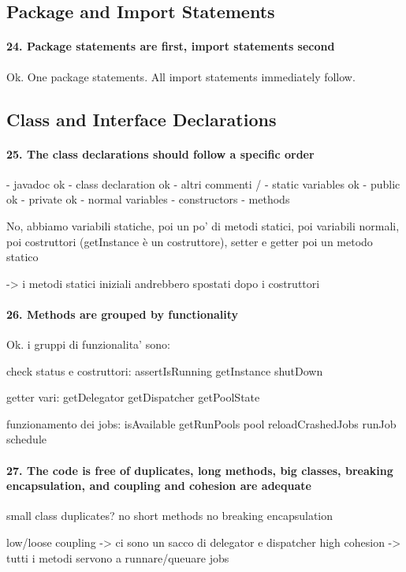 \documentclass[english]{article}
\begin{document}
\subsection{Package and Import Statements}
\paragraph{24. Package statements are first, import statements second}
Ok.
One package statements.
All import statements immediately follow.

\subsection{Class and Interface Declarations}
\paragraph{25. The class declarations should follow a specific order}
- javadoc ok
- class declaration ok
- altri commenti /
- static variables ok
 - public ok
 - private ok
- normal variables 
- constructors
- methods

No, abbiamo variabili statiche, poi un po' di metodi statici, poi variabili normali, poi costruttori (getInstance è un costruttore), setter e getter poi un metodo statico

-> i metodi statici iniziali andrebbero spostati dopo i costruttori


\paragraph{26. Methods are grouped by functionality}
Ok.
i gruppi di funzionalita' sono:

check status e costruttori:
assertIsRunning
getInstance
shutDown

getter vari:
getDelegator
getDispatcher
getPoolState

funzionamento dei jobs:
isAvailable
getRunPools
pool
reloadCrashedJobs
runJob
schedule

\paragraph{27. The code is free of duplicates, long methods, big classes, breaking encapsulation, and coupling and cohesion are adequate}
small class
duplicates? no
short methods
no breaking encapsulation

low/loose coupling -> ci sono un sacco di delegator e dispatcher
high cohesion -> tutti i metodi servono a runnare/queuare jobs
\end{document}
